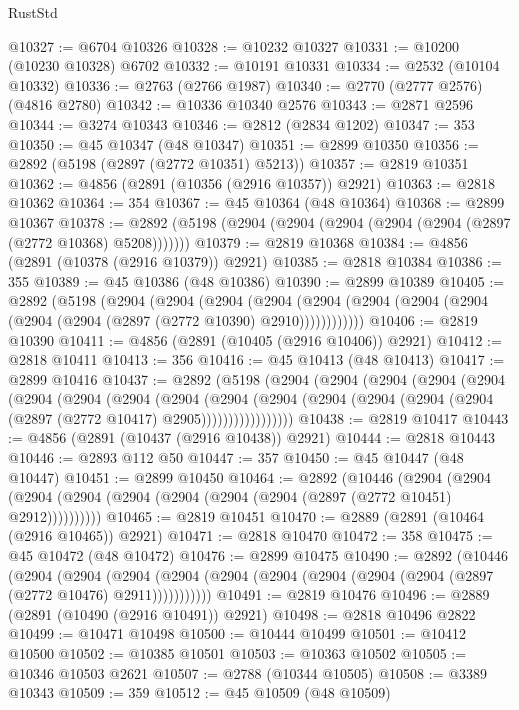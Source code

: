 \begin{lexlean}{RustStd}
\begin{coremodule}
@10327 := @6704 @10326
@10328 := @10232 @10327
@10331 := @10200 (@10230 @10328) @6702
@10332 := @10191 @10331
@10334 := @2532 (@10104 @10332)
@10336 := @2763 (@2766 @1987)
@10340 := @2770 (@2777 @2576) (@4816 @2780)
@10342 := @10336 @10340 @2576
@10343 := @2871 @2596
@10344 := @3274 @10343
@10346 := @2812 (@2834 @1202)
@10347 := 353
@10350 := @45 @10347 (@48 @10347)
@10351 := @2899 @10350
@10356 := @2892 (@5198 (@2897 (@2772 @10351) @5213))
@10357 := @2819 @10351
@10362 := @4856 (@2891 (@10356 (@2916 @10357)) @2921)
@10363 := @2818 @10362
@10364 := 354
@10367 := @45 @10364 (@48 @10364)
@10368 := @2899 @10367
@10378 := @2892 (@5198 (@2904 (@2904 (@2904 (@2904 (@2904 (@2897 (@2772 @10368) @5208)))))))
@10379 := @2819 @10368
@10384 := @4856 (@2891 (@10378 (@2916 @10379)) @2921)
@10385 := @2818 @10384
@10386 := 355
@10389 := @45 @10386 (@48 @10386)
@10390 := @2899 @10389
@10405 := @2892
    (@5198
      (@2904
        (@2904
          (@2904
            (@2904 (@2904 (@2904 (@2904 (@2904 (@2904 (@2904 (@2897 (@2772 @10390) @2910))))))))))))
@10406 := @2819 @10390
@10411 := @4856 (@2891 (@10405 (@2916 @10406)) @2921)
@10412 := @2818 @10411
@10413 := 356
@10416 := @45 @10413 (@48 @10413)
@10417 := @2899 @10416
@10437 := @2892
    (@5198
      (@2904
        (@2904
          (@2904
            (@2904
              (@2904
                (@2904
                  (@2904
                    (@2904
                      (@2904
                        (@2904
                          (@2904
                            (@2904 (@2904 (@2904 (@2904 (@2897 (@2772 @10417) @2905)))))))))))))))))
@10438 := @2819 @10417
@10443 := @4856 (@2891 (@10437 (@2916 @10438)) @2921)
@10444 := @2818 @10443
@10446 := @2893 @112 @50
@10447 := 357
@10450 := @45 @10447 (@48 @10447)
@10451 := @2899 @10450
@10464 := @2892
    (@10446
      (@2904 (@2904 (@2904 (@2904 (@2904 (@2904 (@2904 (@2904 (@2897 (@2772 @10451) @2912))))))))))
@10465 := @2819 @10451
@10470 := @2889 (@2891 (@10464 (@2916 @10465)) @2921)
@10471 := @2818 @10470
@10472 := 358
@10475 := @45 @10472 (@48 @10472)
@10476 := @2899 @10475
@10490 := @2892
    (@10446
      (@2904
        (@2904
          (@2904 (@2904 (@2904 (@2904 (@2904 (@2904 (@2904 (@2897 (@2772 @10476) @2911)))))))))))
@10491 := @2819 @10476
@10496 := @2889 (@2891 (@10490 (@2916 @10491)) @2921)
@10498 := @2818 @10496 @2822
@10499 := @10471 @10498
@10500 := @10444 @10499
@10501 := @10412 @10500
@10502 := @10385 @10501
@10503 := @10363 @10502
@10505 := @10346 @10503 @2621
@10507 := @2788 (@10344 @10505)
@10508 := @3389 @10343
@10509 := 359
@10512 := @45 @10509 (@48 @10509)

\end{coremodule}
\end{lexlean}
